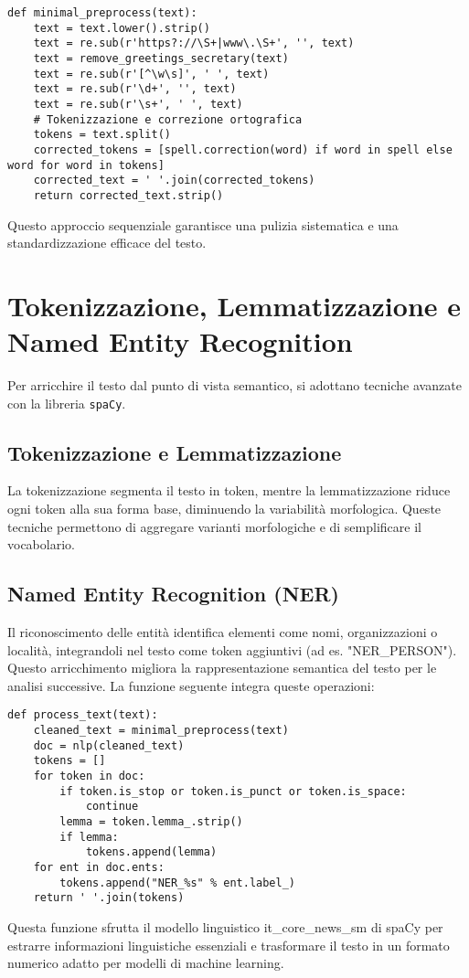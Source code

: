 \begin{lstlisting}[caption={Funzione minimal\_preprocess}]
def minimal_preprocess(text):
    text = text.lower().strip()
    text = re.sub(r'https?://\S+|www\.\S+', '', text)
    text = remove_greetings_secretary(text)
    text = re.sub(r'[^\w\s]', ' ', text)
    text = re.sub(r'\d+', '', text)
    text = re.sub(r'\s+', ' ', text)
    # Tokenizzazione e correzione ortografica
    tokens = text.split()
    corrected_tokens = [spell.correction(word) if word in spell else word for word in tokens]
    corrected_text = ' '.join(corrected_tokens)
    return corrected_text.strip()
\end{lstlisting}

Questo approccio sequenziale garantisce una pulizia sistematica e una standardizzazione efficace del testo.

\section{Tokenizzazione, Lemmatizzazione e Named Entity Recognition}
Per arricchire il testo dal punto di vista semantico, si adottano tecniche avanzate con la libreria \texttt{spaCy}.

\subsection{Tokenizzazione e Lemmatizzazione}
La tokenizzazione segmenta il testo in token, mentre la lemmatizzazione riduce ogni token alla sua forma base, diminuendo la variabilità morfologica. Queste tecniche permettono di aggregare varianti morfologiche e di semplificare il vocabolario.

\subsection{Named Entity Recognition (NER)}
Il riconoscimento delle entità identifica elementi come nomi, organizzazioni o località, integrandoli nel testo come token aggiuntivi (ad es. "NER\_PERSON"). Questo arricchimento migliora la rappresentazione semantica del testo per le analisi successive. La funzione seguente integra queste operazioni:

\begin{lstlisting}[caption={Funzione process\_text}]
def process_text(text):
    cleaned_text = minimal_preprocess(text)
    doc = nlp(cleaned_text)
    tokens = []
    for token in doc:
        if token.is_stop or token.is_punct or token.is_space:
            continue
        lemma = token.lemma_.strip()
        if lemma:
            tokens.append(lemma)
    for ent in doc.ents:
        tokens.append("NER_%s" % ent.label_)
    return ' '.join(tokens)
\end{lstlisting}
Questa funzione sfrutta il modello linguistico it\_core\_news\_sm di spaCy per estrarre informazioni linguistiche essenziali e trasformare il testo in un formato numerico adatto per modelli di machine learning.

